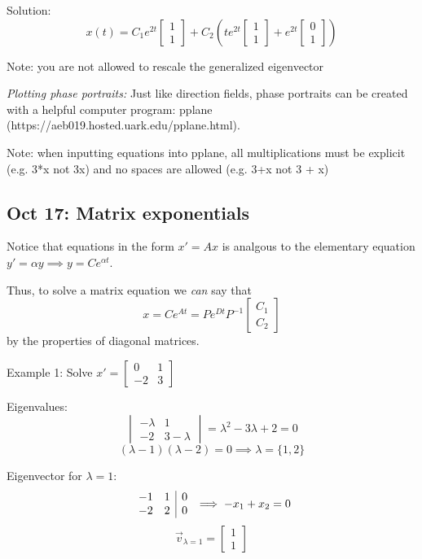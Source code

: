 \documentclass[12pt]{article}
\begin{document}
Solution:
\[\boxed{x(t) = C_1 e^{2t} \begin{bmatrix}
    1\\1
\end{bmatrix} + C_2\left(te^{2t} \begin{bmatrix}
    1\\1
\end{bmatrix} + e^{2t} \begin{bmatrix}
    0\\1
\end{bmatrix}\right)}\]

Note: you are not allowed to rescale the generalized eigenvector

\emph{Plotting phase portraits:} Just like direction fields, phase portraits can be created with a helpful computer program: pplane (https://aeb019.hosted.uark.edu/pplane.html).

Note: when inputting equations into pplane, all multiplications must be explicit (e.g. 3*x not 3x) and no spaces are allowed (e.g. 3+x not 3 + x)

\subsection*{Oct 17: Matrix exponentials}
Notice that equations in the form $x' = Ax$ is analgous to the elementary equation $y' = \alpha y \implies y = Ce^{\alpha t}$. 

Thus, to solve a matrix equation we \emph{can} say that 
\[x = Ce^{At} = Pe^{Dt}P^{-1} \begin{bmatrix}
    C_1\\
    C_2
\end{bmatrix}\]
by the properties of diagonal matrices. 

Example 1: Solve $x' = \begin{bmatrix}
    0 & 1\\
    -2 & 3
\end{bmatrix}$

Eigenvalues:
\[\begin{vmatrix}
    -\lambda & 1\\
    -2 & 3 - \lambda
\end{vmatrix} = \lambda^2 - 3\lambda + 2 = 0\]
\[(\lambda - 1)(\lambda - 2) = 0 \implies \lambda = \{1, 2\}\]

Eigenvector for $\lambda = 1$:
\[\begin{array}{c c |c}
    -1 & 1 & 0\\
    -2 & 2 & 0
\end{array} \implies -x_1 + x_2 = 0\]
\[\vec{v}_{\lambda = 1} = \begin{bmatrix}
    1\\
    1
\end{bmatrix}\]
\end{document}
